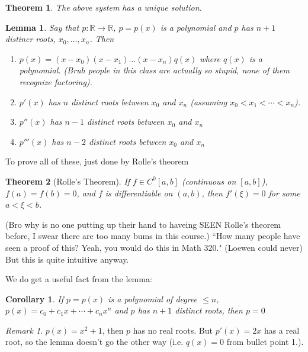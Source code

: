 \documentclass{article}
\theoremstyle{plain}
\newtheorem{theorem}{Theorem}
\newtheorem{lemma}{Lemma}
\newtheorem{corollary}{Corollary}
\theoremstyle{remark}
\newtheorem{remark}{Remark}
\newcommand{\R}{{\mathbb R}}
\begin{document}
\begin{theorem}
	The above system has a unique solution.
\end{theorem}
\begin{lemma}
	Say that $p \colon \R \to \R$, $p = p(x)$ is a polynomial and $p$
	has $n+1$ distincr roots, $x_0,\dots,x_n$.
	Then
	\begin{enumerate}
		\item[1.] $p(x) = (x - x_0)(x-x_1)\dots(x-x_n)q(x)$ where $q(x)$ is a polynomial.
			(Bruh people in this class are actually so stupid,
			none of them recognize factoring).
		\item[2.] $p'(x)$ has $n$ distinct roots between $x_0$ and $x_n$
			(assuming $x_0 < x_1 < \cdots < x_n$).
		\item $p''(x)$ has $n-1$ distinct roots between $x_0$ and $x_n$
		\item $p'''(x)$ has $n-2$ distinct roots between $x_0$ and $x_n$
	\end{enumerate}
\end{lemma}

To prove all of these, just done by Rolle's theorem
\begin{theorem}[Rolle's Theorem]
	If $f \in C^{0}[a,b]$ (continuous on $[a,b]$), $f(a) = f(b) = 0$, and
	$f$ is differentiable on $(a,b)$, then $f'(\xi) = 0$ for some $a < \xi < b$.
\end{theorem}
(Bro why is no one putting up their hand to haveing SEEN Rolle's theorem before,
I swear there are too many bums in this course.)
``How many people have seen a proof of this? Yeah, you would do this in Math 320."
(Loewen could never)
But this is quite intuitive anyway.

We do get a useful fact from the lemma:
\begin{corollary}
	If $p = p(x)$ is a polynomial of degree $\leq n$,
	$p(x) = c_0 + c_1x + \cdots + c_nx^n$ and $p$ has $n+1$ distinct roots,
	then $p = 0$
\end{corollary}

\begin{remark}
	$p(x) = x^2 + 1$, then $p$ has no real roots.
	But $p'(x) = 2x$ has a real root, so the lemma doesn't go the other way
	(i.e. $q(x) = 0$ from bullet point 1.).
\end{remark}
\end{document}
